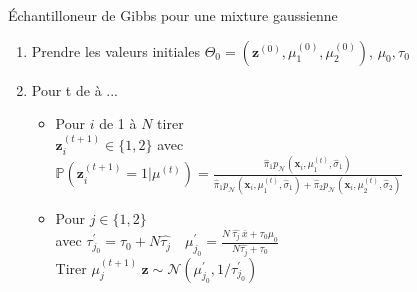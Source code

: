 \begin{frame}
    \small
    \begin{exampleblock}{\'Echantilloneur de Gibbs pour une mixture gaussienne}
    \begin{enumerate}
        \item Prendre les valeurs initiales $\Theta_0 = (\boldsymbol{z}^{(0)}, \mu_{1}^{(0)}, \mu_{2}^{(0)})$, $\mu_0, \tau_0$
        \item Pour t de  à ...
            \begin{itemize}
                \item Pour $i$ de 1 à $N$ tirer \\
                {\addtolength{\leftskip}{2cm} 
                    $\boldsymbol{z}_i^{(t+1)} \in \{1, 2 \}$ avec $\mathbb{P}(\boldsymbol{z}_i^{(t+1)}=1 | \mu^{(t)}) = 
                    { \displaystyle \frac{
                    \hat{\pi}_{1}  p_{\mathcal{N}}(\boldsymbol{x}_i,\mu_{1}^{(t)}, \hat{\sigma}_{1})
                    }{
                        \hat{\pi}_{1}  p_{\mathcal{N}}(\boldsymbol{x}_i,\mu_{1}^{(t)}, \hat{\sigma}_{1})  +  
                        \hat{\pi}_{2}  p_{\mathcal{N}}(\boldsymbol{x}_i,\mu_{2}^{(t)}, \hat{\sigma}_{2})
                    }}$
                }
                \item Pour $j \in \{ 1,2\} $ \\
                avec 
                $\tau^{\prime}_{j_0} = \tau_0 + N \hat{\tau_j} \quad \displaystyle
                \mu_{j_0}^{\prime} = \frac{N\ \hat{\tau_j}\ \bar{x}+\tau_{0} \mu_{0}}{N \hat{\tau_j}+\tau_{0}} 
                $ \\
                Tirer $\mu_{j}^{(t+1)}\ \boldsymbol{z} \sim \mathcal{N}\left(\mu_{j_0}^{\prime}, 1 / \tau^{\prime}_{j_0}\right)$
            \end{itemize}
    \end{enumerate}
   
\end{exampleblock}
\end{frame}

